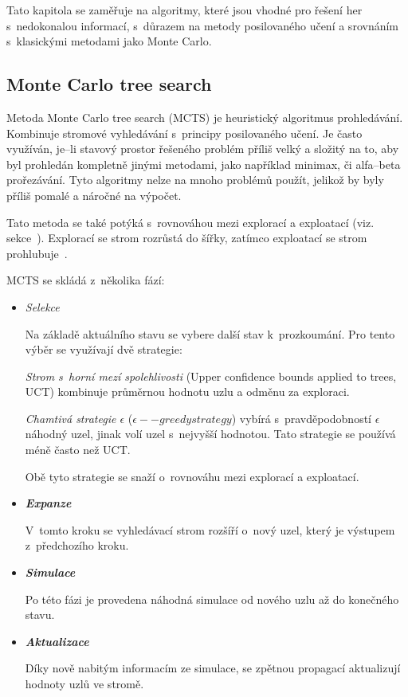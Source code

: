 Tato kapitola se zaměřuje na algoritmy, které jsou vhodné pro řešení her s~nedokonalou informací, s~důrazem na metody posilovaného učení a srovnáním s~klasickými metodami jako Monte Carlo.

\subsection{Monte Carlo tree search}\label{subsec:monte-carlo-tree-search}
Metoda Monte Carlo tree search (MCTS) je heuristický algoritmus prohledávání.
Kombinuje stromové vyhledávání s~principy posilovaného učení.
Je často využíván, je--li stavový prostor řešeného problém příliš velký a složitý na to, aby byl prohledán kompletně jinými metodami, jako například minimax, či alfa--beta prořezávání.
Tyto  algoritmy nelze na mnoho problémů použít, jelikož by byly příliš pomalé a náročné na výpočet.

Tato metoda se také potýká s~rovnováhou mezi explorací a exploatací (viz.~ sekce~).
Explorací se strom rozrůstá do šířky, zatímco exploatací se strom prohlubuje~\cite{mcts_geeksforgeeks}.

MCTS se skládá z~několika fází:
\begin{itemize}
  \item \emph{Selekce}

  Na základě aktuálního stavu se vybere další stav k~prozkoumání.
  Pro tento výběr se využívají dvě strategie:
  
  \emph{Strom s~horní mezí spolehlivosti} (Upper confidence bounds applied to trees, UCT) kombinuje průměrnou hodnotu uzlu a odměnu za exploraci.

  \label{epsilon_greedy}
  \emph{Chamtivá strategie $\epsilon$ } ($\epsilon--greedy strategy$) vybírá s~pravděpodobností $\epsilon$ náhodný uzel, jinak volí uzel s~nejvyšší hodnotou.
  Tato strategie se používá méně často než UCT\@.

  Obě tyto strategie se snaží o~rovnováhu mezi explorací a exploatací.
  \item \textbf{\emph{Expanze}}

  V~tomto kroku se vyhledávací strom rozšíří o~nový uzel, který je výstupem z~předchozího kroku.

  \item \textbf{\emph{Simulace}}

  Po této fázi je provedena náhodná simulace od nového uzlu až do konečného stavu.

  \item \textbf{\emph{Aktualizace}}
  
  Díky nově nabitým informacím ze simulace, se zpětnou propagací aktualizují hodnoty uzlů ve stromě.

\end{itemize}

